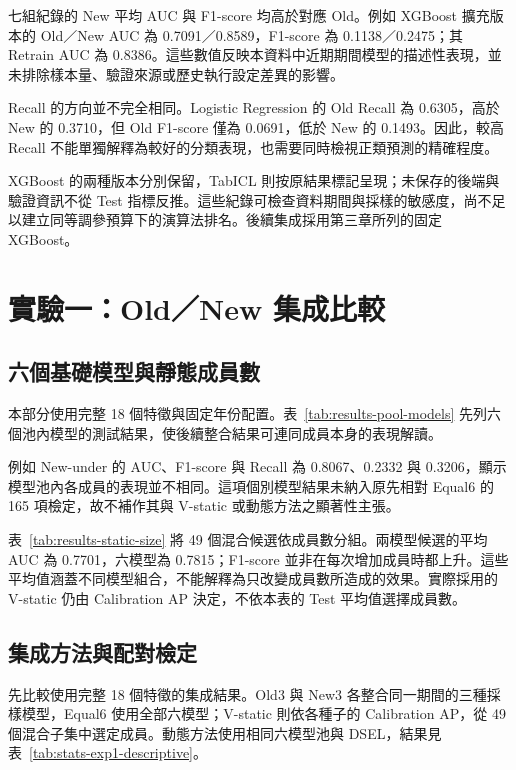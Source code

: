 七組紀錄的 New 平均 AUC 與 F1-score 均高於對應 Old。例如 XGBoost 擴充版本的 Old／New AUC 為 0.7091／0.8589，F1-score 為 0.1138／0.2475；其 Retrain AUC 為 0.8386。這些數值反映本資料中近期期間模型的描述性表現，並未排除樣本量、驗證來源或歷史執行設定差異的影響。

Recall 的方向並不完全相同。Logistic Regression 的 Old Recall 為 0.6305，高於 New 的 0.3710，但 Old F1-score 僅為 0.0691，低於 New 的 0.1493。因此，較高 Recall 不能單獨解釋為較好的分類表現，也需要同時檢視正類預測的精確程度。

XGBoost 的兩種版本分別保留，TabICL 則按原結果標記呈現；未保存的後端與驗證資訊不從 Test 指標反推。這些紀錄可檢查資料期間與採樣的敏感度，尚不足以建立同等調參預算下的演算法排名。後續集成採用第三章所列的固定 XGBoost。

\section{實驗一：Old／New 集成比較}\label{sec:results-experiment1}

\subsection{六個基礎模型與靜態成員數}

本部分使用完整 18 個特徵與固定年份配置。表~\ref{tab:results-pool-models} 先列六個池內模型的測試結果，使後續整合結果可連同成員本身的表現解讀。



例如 New-under 的 AUC、F1-score 與 Recall 為 0.8067、0.2332 與 0.3206，顯示模型池內各成員的表現並不相同。這項個別模型結果未納入原先相對 Equal6 的 165 項檢定，故不補作其與 V-static 或動態方法之顯著性主張。



表~\ref{tab:results-static-size} 將 49 個混合候選依成員數分組。兩模型候選的平均 AUC 為 0.7701，六模型為 0.7815；F1-score 並非在每次增加成員時都上升。這些平均值涵蓋不同模型組合，不能解釋為只改變成員數所造成的效果。實際採用的 V-static 仍由 Calibration AP 決定，不依本表的 Test 平均值選擇成員數。

\subsection{集成方法與配對檢定}

先比較使用完整 18 個特徵的集成結果。Old3 與 New3 各整合同一期間的三種採樣模型，Equal6 使用全部六模型；V-static 則依各種子的 Calibration AP，從 49 個混合子集中選定成員。動態方法使用相同六模型池與 DSEL，結果見表~\ref{tab:stats-exp1-descriptive}。

